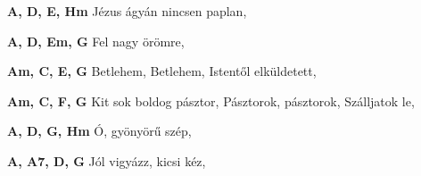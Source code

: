 \begin{multicols}{2}
\begin{minipage}{\textwidth}
\end{minipage}
\begin{minipage}{\textwidth}
\textbf{A, D, E, Hm}\newline
\textbullet\hspace{1 mm}Jézus ágyán nincsen paplan, \pageref{JC3A9zusC3A1gyC3A1nnincsenpaplan}\newline

\end{minipage}
\begin{minipage}{\textwidth}
\textbf{A, D, Em, G}\newline
\textbullet\hspace{1 mm}Fel nagy örömre, \pageref{FelnagyC3B6rC3B6mre}\newline

\end{minipage}
\begin{minipage}{\textwidth}
\textbf{Am, C, E, G}\newline
\textbullet\hspace{1 mm}Betlehem, Betlehem, \pageref{Betlehem2CBetlehem}\newline
\textbullet\hspace{1 mm}Istentől elküldetett, \pageref{IstentC591lelkC3BCldetett}\newline

\end{minipage}
\begin{minipage}{\textwidth}
\textbf{Am, C, F, G}\newline
\textbullet\hspace{1 mm}Kit sok boldog pásztor, \pageref{KitsokboldogpC3A1sztor}\newline
\textbullet\hspace{1 mm}Pásztorok, pásztorok, \pageref{PC3A1sztorok2CpC3A1sztorok}\newline
\textbullet\hspace{1 mm}Szálljatok le, \pageref{SzC3A1lljatokle}\newline

\end{minipage}
\begin{minipage}{\textwidth}
\textbf{A, D, G, Hm}\newline
\textbullet\hspace{1 mm}Ó, gyönyörű szép, \pageref{C3932CgyC3B6nyC3B6rC5B1szC3A9p}\newline

\end{minipage}
\begin{minipage}{\textwidth}
\textbf{A, A7, D, G}\newline
\textbullet\hspace{1 mm}Jól vigyázz, kicsi kéz, \pageref{JC3B3lvigyC3A1zz2CkicsikC3A9z}\newline


\end{minipage}
\end{multicols}
